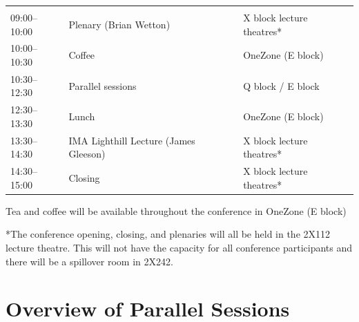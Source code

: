 \documentclass[12pt,a4paper]{article}
\begin{document}
\begin{tabularx}{\linewidth}{P{20mm}YP{50mm}}
  \\
  09:00--10:00 & Plenary (Brian Wetton) & X block lecture theatres*\\
  10:00--10:30 & Coffee & OneZone (E block) \\
  10:30--12:30 & Parallel sessions & Q block / E block\\
  12:30--13:30 & Lunch & OneZone (E block)\\
  13:30--14:30 & IMA Lighthill Lecture (James Gleeson) & X block lecture theatres*\\
  14:30--15:00 & Closing & X block lecture theatres*
\end{tabularx}

Tea and coffee will be available throughout the conference in OneZone (E block)

*The conference opening, closing, and plenaries will all be held in the 2X112 lecture theatre. This will not have the capacity for all conference participants and there will be a spillover room in 2X242.

\section{Overview of Parallel Sessions}
\end{document}
